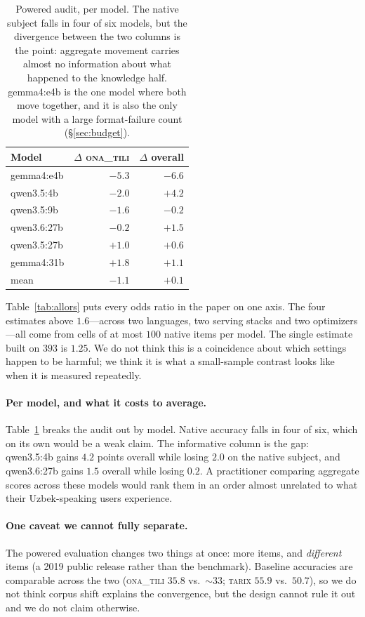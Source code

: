 \documentclass[11pt]{article}
\newcommand{\ona}{\textsc{ona\_tili}}
\newcommand{\tarix}{\textsc{tarix}}
\begin{document}
\begin{table}[t]\centering\small
\caption{Powered audit, per model. The native subject falls in four of six models, but
the divergence between the two columns is the point: aggregate movement carries almost no
information about what happened to the knowledge half. gemma4:e4b is the one model where
both move together, and it is also the only model with a large format-failure count
(\S\ref{sec:budget}).}
\label{tab:permodel}
\setlength{\tabcolsep}{5pt}
\begin{tabular}{lrr}
\toprule
Model & $\Delta$ \ona{} & $\Delta$ overall \\
\midrule
gemma4:e4b   & $-5.3$ & $-6.6$ \\
qwen3.5:4b   & $-2.0$ & $+4.2$ \\
qwen3.5:9b   & $-1.6$ & $-0.2$ \\
qwen3.6:27b  & $-0.2$ & $+1.5$ \\
qwen3.5:27b  & $+1.0$ & $+0.6$ \\
gemma4:31b   & $+1.8$ & $+1.1$ \\
\midrule
mean         & $-1.1$ & $+0.1$ \\
\bottomrule
\end{tabular}
\end{table}

Table~\ref{tab:allors} puts every odds ratio in the paper on one axis. The four
estimates above $1.6$---across two languages, two serving stacks and two
optimizers---all come from cells of at most $100$ native items per model. The single
estimate built on $393$ is $1.25$. We do not think this is a coincidence about which
settings happen to be harmful; we think it is what a small-sample contrast looks like
when it is measured repeatedly.

\paragraph{Per model, and what it costs to average.} Table~\ref{tab:permodel} breaks the
audit out by model. Native accuracy falls in four of six, which on its own would be a
weak claim. The informative column is the gap: qwen3.5:4b gains $4.2$ points overall
while losing $2.0$ on the native subject, and qwen3.6:27b gains $1.5$ overall while
losing $0.2$. A practitioner comparing aggregate scores across these models would rank
them in an order almost unrelated to what their Uzbek-speaking users experience.

\paragraph{One caveat we cannot fully separate.} The powered evaluation changes two
things at once: more items, and \emph{different} items (a 2019 public release rather
than the benchmark). Baseline accuracies are comparable across the two
(\ona{} $35.8$ vs.\ ${\sim}33$; \tarix{} $55.9$ vs.\ $50.7$), so we do not think corpus
shift explains the convergence, but the design cannot rule it out and we do not claim
otherwise.
\end{document}
